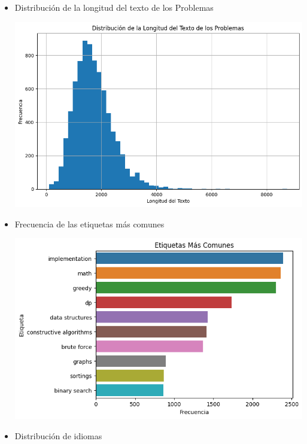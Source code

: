 \documentclass{article}
\begin{document}
\begin{itemize}
    \item Distribución de la longitud del texto de los Problemas
          \begin{center}
              \includegraphics[scale=0.8]{imgs/len_description.png}
          \end{center}
          \newpage          
    \item Frecuencia de las etiquetas más comunes
          \begin{center}
              \includegraphics[scale=0.8]{imgs/common_tags_count.png}
          \end{center}
    \item Distribución de idiomas
          \begin{center}

\end{center}
\end{itemize}
\end{document}
